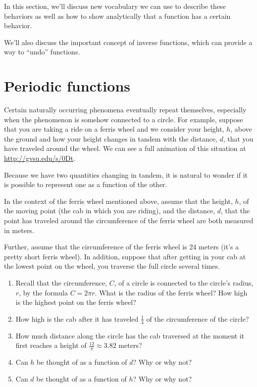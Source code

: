 \documentclass[nooutcomes]{ximera}
\begin{document}
In this section, we'll discuss new vocabulary we can use to describe these behaviors as well as how to show analytically that a function has a certain behavior. 

We'll also discuss the important concept of inverse functions, which can provide a way to ``undo'' functions. 


\section{Periodic functions}

Certain naturally occurring phenomena eventually repeat themselves, especially when the phenomenon is somehow connected to a circle. For example, suppose that you are taking a ride on a ferris wheel and we consider your height, $h$, above the ground and how your height changes in tandem with the distance, $d$, that you have traveled around the wheel. We can see a full animation of this situation at \url{http://gvsu.edu/s/0Dt}. 

Because we have two quantities changing in tandem, it is natural to wonder if it is possible to represent one as a function of the other.


\begin{exploration}
In the context of the ferris wheel mentioned above, assume that the height, $h$, of the moving point (the cab in which you are riding), and the distance, $d$, that the point has traveled around the circumference of the ferris wheel are both measured in meters.

Further, assume that the circumference of the ferris wheel is 24 meters (it's a pretty short ferris wheel). In addition, suppose that after getting in your cab at the lowest point on the wheel, you traverse the full circle several times.

\begin{enumerate}
\item Recall that the circumference, $C$, of a circle is connected to the circle's radius, $r$, by the formula $C = 2\pi r$. What is the radius of the ferris wheel? How high is the highest point on the ferris wheel?

\item How high is the cab after it has traveled $\frac{1}{4}$ of the circumference of the circle?

\item How much distance along the circle has the cab traversed at the moment it first reaches a height of $\frac{12}{\pi} \approx 3.82$ meters?

\item Can $h$ be thought of as a function of $d$? Why or why not?

\item Can $d$ be thought of as a function of $h$? Why or why not?
\end{enumerate}
\end{exploration}
\end{document}
